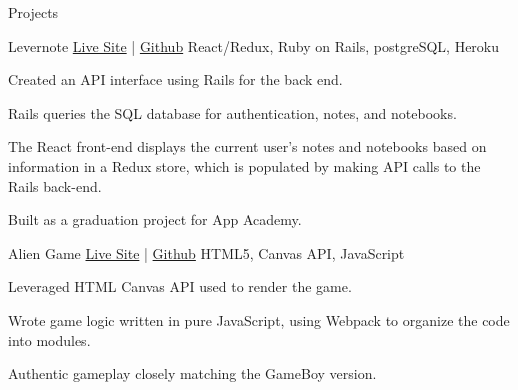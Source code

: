 \documentclass{resume}
\begin{document}
\begin{rSection}{Projects}
    \begin{rSubsection}{Levernote}
        {\href{https://levernote.herokuapp.com/}{Live Site} |
            \href{https://github.com/philowe94/levernote}{Github}}
        {React/Redux, Ruby on Rails, postgreSQL, Heroku}{}
        \item Created an API interface using Rails for the back end.
        \item Rails queries the SQL database for authentication, notes, and notebooks.
        \item The React front-end displays the current user’s notes and notebooks based on information in a Redux store, which is populated by making API calls to the Rails back-end.
        \item Built as a graduation project for App Academy.
    \end{rSubsection}


    \begin{rSubsection}{Alien Game}
        {\href{https://philowe94.github.io/alien-game/}{Live Site} |
            \href{https://github.com/philowe94/alien-game}{Github}}
        {HTML5, Canvas API, JavaScript}{}
        \item Leveraged HTML Canvas API used to render the game.
        \item Wrote game logic written in pure JavaScript, using Webpack to organize the code into modules.
        \item Authentic gameplay closely matching the GameBoy version.
    \end{rSubsection}

\end{rSection}
\end{document}
